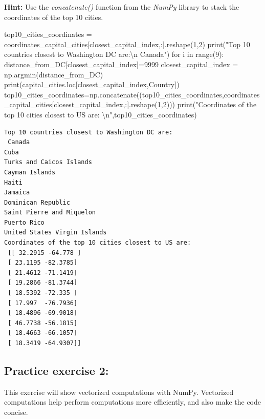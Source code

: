 \documentclass[
  letterpaper,
  DIV=11,
  numbers=noendperiod]{scrreprt}
\newenvironment{Shaded}{\begin{snugshade}}{\end{snugshade}}
\newcommand{\BuiltInTok}[1]{\textcolor[rgb]{0.00,0.23,0.31}{#1}}
\newcommand{\CharTok}[1]{\textcolor[rgb]{0.13,0.47,0.30}{#1}}
\newcommand{\ControlFlowTok}[1]{\textcolor[rgb]{0.00,0.23,0.31}{#1}}
\newcommand{\DecValTok}[1]{\textcolor[rgb]{0.68,0.00,0.00}{#1}}
\newcommand{\KeywordTok}[1]{\textcolor[rgb]{0.00,0.23,0.31}{#1}}
\newcommand{\NormalTok}[1]{\textcolor[rgb]{0.00,0.23,0.31}{#1}}
\newcommand{\OperatorTok}[1]{\textcolor[rgb]{0.37,0.37,0.37}{#1}}
\newcommand{\StringTok}[1]{\textcolor[rgb]{0.13,0.47,0.30}{#1}}
\begin{document}
\textbf{Hint:} Use the \emph{concatenate()} function from the
\emph{NumPy} library to stack the coordinates of the top 10 cities.

\begin{Shaded}
\begin{Highlighting}[]
\NormalTok{top10\_cities\_coordinates }\OperatorTok{=}\NormalTok{ coordinates\_capital\_cities[closest\_capital\_index,:].reshape(}\DecValTok{1}\NormalTok{,}\DecValTok{2}\NormalTok{)}
\BuiltInTok{print}\NormalTok{(}\StringTok{"Top 10 countries closest to Washington DC are:}\CharTok{\textbackslash{}n}\StringTok{ Canada"}\NormalTok{)}
\ControlFlowTok{for}\NormalTok{ i }\KeywordTok{in} \BuiltInTok{range}\NormalTok{(}\DecValTok{9}\NormalTok{):}
\NormalTok{    distance\_from\_DC[closest\_capital\_index]}\OperatorTok{=}\DecValTok{9999}
\NormalTok{    closest\_capital\_index }\OperatorTok{=}\NormalTok{ np.argmin(distance\_from\_DC)}
    \BuiltInTok{print}\NormalTok{(capital\_cities.loc[closest\_capital\_index,}\StringTok{\textquotesingle{}Country\textquotesingle{}}\NormalTok{])}
\NormalTok{    top10\_cities\_coordinates}\OperatorTok{=}\NormalTok{np.concatenate((top10\_cities\_coordinates,coordinates\_capital\_cities[closest\_capital\_index,:].reshape(}\DecValTok{1}\NormalTok{,}\DecValTok{2}\NormalTok{)))}
\BuiltInTok{print}\NormalTok{(}\StringTok{"Coordinates of the top 10 cities closest to US are: }\CharTok{\textbackslash{}n}\StringTok{"}\NormalTok{,top10\_cities\_coordinates)}
\end{Highlighting}
\end{Shaded}

\begin{verbatim}
Top 10 countries closest to Washington DC are:
 Canada
Cuba
Turks and Caicos Islands
Cayman Islands
Haiti
Jamaica
Dominican Republic
Saint Pierre and Miquelon
Puerto Rico
United States Virgin Islands
Coordinates of the top 10 cities closest to US are: 
 [[ 32.2915 -64.778 ]
 [ 23.1195 -82.3785]
 [ 21.4612 -71.1419]
 [ 19.2866 -81.3744]
 [ 18.5392 -72.335 ]
 [ 17.997  -76.7936]
 [ 18.4896 -69.9018]
 [ 46.7738 -56.1815]
 [ 18.4663 -66.1057]
 [ 18.3419 -64.9307]]
\end{verbatim}

\hypertarget{practice-exercise-2-1}{%
\subsection{Practice exercise 2:}\label{practice-exercise-2-1}}

This exercise will show vectorized computations with NumPy. Vectorized
computations help perform computations more efficiently, and also make
the code concise.
\end{document}
